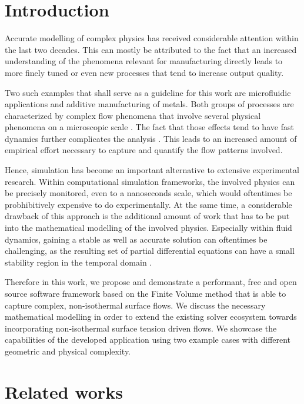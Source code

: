 \documentclass[conference,final]{IEEEtran}
\begin{document}
\section{Introduction}

Accurate modelling of complex physics has received considerable attention within the last two decades.
This can mostly be attributed to the fact that an increased understanding of the phenomena relevant for manufacturing directly leads to more finely tuned or even new processes that tend to increase output quality.

Two such examples that shall serve as a guideline for this work are microfluidic applications and additive manufacturing of metals.
Both groups of processes are characterized by complex flow phenomena that involve several physical phenomena on a microscopic scale \cite{sackmannPresentFutureRole,debroyAdditiveManufacturingMetallic2018}. The fact that those effects tend to have fast dynamics further complicates the analysis \cite{khairallahControllingInterdependentMesonanosecond2020}. This leads to an increased amount of empirical effort necessary to capture and quantify the flow patterns involved.

Hence, simulation has become an important alternative to extensive experimental research. Within computational simulation frameworks, the involved physics can be precisely monitored, even to a nanoseconds scale, which would oftentimes be probhibitively expensive to do experimentally. At the same time, a considerable drawback of this approach is the additional amount of work that has to be put into the mathematical modelling of the involved physics. Especially within fluid dynamics, gaining a stable as well as accurate solution can oftentimes be challenging, as the resulting set of partial differential equations can have a small stability region in the temporal domain \cite{laxStabilityDifferenceSchemes2013}.

Therefore in this work, we propose and demonstrate a performant, free and open source software framework based on the Finite Volume method that is able to capture complex, non-isothermal surface flows. We discuss the necessary mathematical modelling in order to extend the existing solver ecosystem towards incorporating non-isothermal surface tension driven flows. We showcase the capabilities of the developed application using two example cases with different geometric and physical complexity.

\section{Related works}
\end{document}
